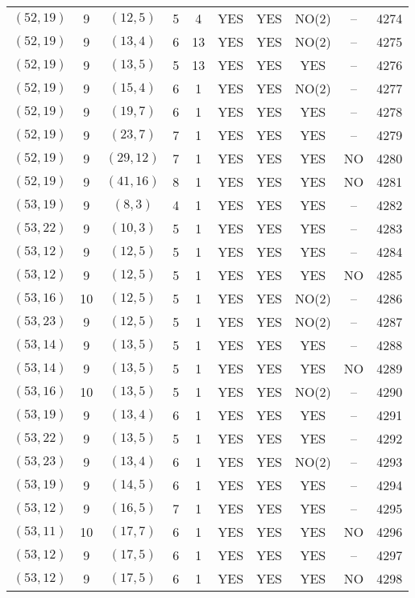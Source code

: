 \begin{longtable}{|c|c|c|c|c|c|c|c|c|c|}
$(52, 19)$ & 9 & $(12, 5)$ & 5 & 4 & YES & YES & NO(2) & -- & 4274\\
$(52, 19)$ & 9 & $(13, 4)$ & 6 & 13 & YES & YES & NO(2) & -- & 4275\\
$(52, 19)$ & 9 & $(13, 5)$ & 5 & 13 & YES & YES & YES & -- & 4276\\
$(52, 19)$ & 9 & $(15, 4)$ & 6 & 1 & YES & YES & NO(2) & -- & 4277\\
$(52, 19)$ & 9 & $(19, 7)$ & 6 & 1 & YES & YES & YES & -- & 4278\\
$(52, 19)$ & 9 & $(23, 7)$ & 7 & 1 & YES & YES & YES & -- & 4279\\
$(52, 19)$ & 9 & $(29, 12)$ & 7 & 1 & YES & YES & YES & NO & 4280\\
$(52, 19)$ & 9 & $(41, 16)$ & 8 & 1 & YES & YES & YES & NO & 4281\\
$(53, 19)$ & 9 & $(8, 3)$ & 4 & 1 & YES & YES & YES & -- & 4282\\
$(53, 22)$ & 9 & $(10, 3)$ & 5 & 1 & YES & YES & YES & -- & 4283\\
$(53, 12)$ & 9 & $(12, 5)$ & 5 & 1 & YES & YES & YES & -- & 4284\\
$(53, 12)$ & 9 & $(12, 5)$ & 5 & 1 & YES & YES & YES & NO & 4285\\
$(53, 16)$ & 10 & $(12, 5)$ & 5 & 1 & YES & YES & NO(2) & -- & 4286\\
$(53, 23)$ & 9 & $(12, 5)$ & 5 & 1 & YES & YES & NO(2) & -- & 4287\\
$(53, 14)$ & 9 & $(13, 5)$ & 5 & 1 & YES & YES & YES & -- & 4288\\
$(53, 14)$ & 9 & $(13, 5)$ & 5 & 1 & YES & YES & YES & NO & 4289\\
$(53, 16)$ & 10 & $(13, 5)$ & 5 & 1 & YES & YES & NO(2) & -- & 4290\\
$(53, 19)$ & 9 & $(13, 4)$ & 6 & 1 & YES & YES & YES & -- & 4291\\
$(53, 22)$ & 9 & $(13, 5)$ & 5 & 1 & YES & YES & YES & -- & 4292\\
$(53, 23)$ & 9 & $(13, 4)$ & 6 & 1 & YES & YES & NO(2) & -- & 4293\\
$(53, 19)$ & 9 & $(14, 5)$ & 6 & 1 & YES & YES & YES & -- & 4294\\
$(53, 12)$ & 9 & $(16, 5)$ & 7 & 1 & YES & YES & YES & -- & 4295\\
$(53, 11)$ & 10 & $(17, 7)$ & 6 & 1 & YES & YES & YES & NO & 4296\\
$(53, 12)$ & 9 & $(17, 5)$ & 6 & 1 & YES & YES & YES & -- & 4297\\
$(53, 12)$ & 9 & $(17, 5)$ & 6 & 1 & YES & YES & YES & NO & 4298\\

\end{longtable}
